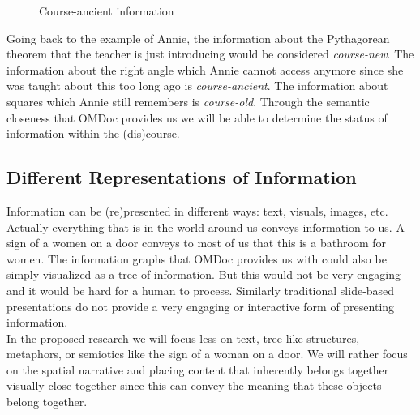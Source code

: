 \documentclass[twoside, 12pt]{article}
\begin{document}
\begin{figure}
\vspace{-26pt}
  \begin{center}
  \end{center}
\vspace{-20pt}
  \caption{Course-ancient information}
  \label{fig:Annie-ancient}
\vspace{-10pt}
\end{figure}

Going back to the example of Annie, the information about the Pythagorean theorem that the teacher is just introducing would be considered \textit{course-new}. The information about the right angle which Annie cannot access anymore since she was taught about this too long ago is \textit{course-ancient}. The information about squares which Annie still remembers is \textit{course-old}. Through the semantic closeness that OMDoc provides us we will be able to determine the status of information within the (dis)course. \\

\subsection{Different Representations of Information}
\label{sec:inforep}

Information can be (re)presented in different ways: text, visuals, images, etc. Actually everything that is in the world around us conveys information to us. A sign of a women on a door conveys to most of us that this is a bathroom for women. The information graphs that OMDoc provides us with could also be simply visualized as a tree of information. But this would not be very engaging and it would be hard for a human to process. Similarly traditional slide-based presentations do not provide a very engaging or interactive form of presenting information. \\  

In the proposed research we will focus less on text, tree-like structures, metaphors, or semiotics like the sign of a woman on a door. We will rather focus on the spatial narrative and placing content that inherently belongs together visually close together since this can convey the meaning that these objects belong together.\\
\end{document}
